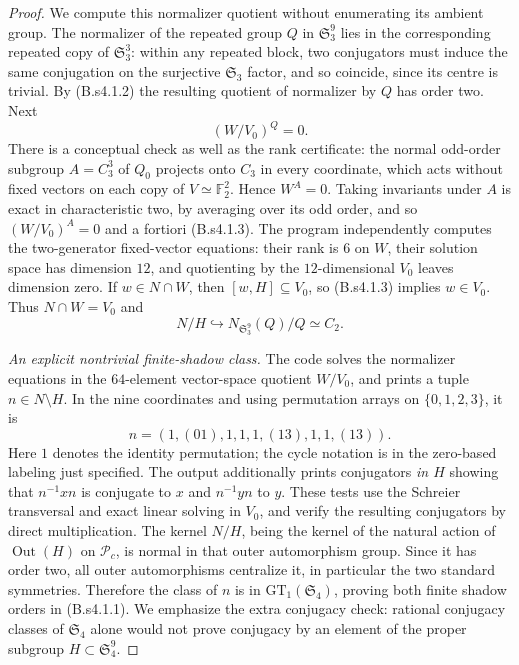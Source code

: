 \begin{proof}
We compute this normalizer quotient without enumerating its ambient group.
The normalizer of the repeated group $Q$ in $\mathfrak S_3^9$ lies in
the corresponding repeated copy of $\mathfrak S_3^3$: within any repeated
block, two conjugators must induce the same conjugation on the surjective
$\mathfrak S_3$ factor, and so coincide, since its centre is trivial.
By (B.s4.1.2) the resulting quotient of normalizer by $Q$ has order two.
Next
\[
 (W/V_0)^Q=0. \tag{B.s4.1.3}
\]
There is a conceptual check as well as the rank certificate: the normal
odd-order subgroup $A=C_3^3$ of $Q_0$ projects onto $C_3$ in every
coordinate, which acts without fixed vectors on each copy of
$V\simeq\mathbb F_2^2$. Hence $W^A=0$. Taking invariants under $A$ is
exact in characteristic two, by averaging over its odd order, and so
$(W/V_0)^A=0$ and a fortiori (B.s4.1.3). The program independently
computes the two-generator fixed-vector equations: their rank is $6$ on
$W$, their solution space has dimension $12$, and quotienting by the
$12$-dimensional $V_0$ leaves dimension zero.
If $w\in N\cap W$, then $[w,H]\subseteq V_0$, so (B.s4.1.3) implies
$w\in V_0$. Thus $N\cap W=V_0$ and
\[
 N/H\hookrightarrow N_{\mathfrak S_3^9}(Q)/Q\simeq C_2.
\]

\emph{An explicit nontrivial finite-shadow class.}
The code solves the normalizer equations in the $64$-element vector-space
quotient $W/V_0$, and prints a tuple $n\in N\setminus H$. In the nine
coordinates and using permutation arrays on $\{0,1,2,3\}$, it is
\[
 n=(1,(01),1,1,1,(13),1,1,(13)).
 \tag{B.s4.1.4}
\]
Here $1$ denotes the identity permutation; the cycle notation is in the
zero-based labeling just specified. The output additionally prints
conjugators \emph{in $H$} showing that $n^{-1}xn$ is conjugate to $x$
and $n^{-1}yn$ to $y$. These tests use the Schreier transversal and exact
linear solving in $V_0$, and verify the resulting conjugators by direct
multiplication. The kernel $N/H$, being the kernel of the natural action
of $\operatorname{Out}(H)$ on $\mathcal P_c$, is normal in that outer
automorphism group. Since it has order two, all outer automorphisms
centralize it, in particular the two standard symmetries. Therefore the
class of $n$ is in $\mathrm{GT}_1(\mathfrak S_4)$, proving both finite
shadow orders in (B.s4.1.1). We emphasize the extra conjugacy check:
rational conjugacy classes of $\mathfrak S_4$ alone would not prove
conjugacy by an element of the proper subgroup $H\subset\mathfrak S_4^9$.


\end{proof}
